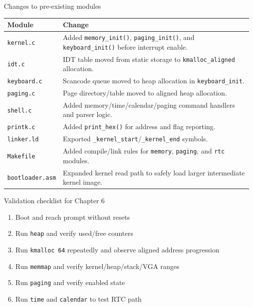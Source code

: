 \documentclass[aspectratio=169]{beamer}
\begin{document}
\begin{frame}{Changes to pre-existing modules}
  \small
  \begin{tabular}{@{}p{2.5cm}p{9.5cm}@{}}
    \toprule
    \textbf{Module} & \textbf{Change} \\
    \midrule
    \texttt{kernel.c} & Added \texttt{memory\_init()}, \texttt{paging\_init()}, and \texttt{keyboard\_init()} before interrupt enable. \\
    \texttt{idt.c} & IDT table moved from static storage to \texttt{kmalloc\_aligned} allocation. \\
    \texttt{keyboard.c} & Scancode queue moved to heap allocation in \texttt{keyboard\_init}. \\
    \texttt{paging.c} & Page directory/table moved to aligned heap allocation. \\
    \texttt{shell.c} & Added memory/time/calendar/paging command handlers and parser logic. \\
    \texttt{printk.c} & Added \texttt{print\_hex()} for address and flag reporting. \\
    \texttt{linker.ld} & Exported \texttt{\_kernel\_start}/\texttt{\_kernel\_end} symbols. \\
    \texttt{Makefile} & Added compile/link rules for \texttt{memory}, \texttt{paging}, and \texttt{rtc} modules. \\
    \texttt{bootloader.asm} & Expanded kernel read path to safely load larger intermediate kernel image. \\
    \bottomrule
  \end{tabular}
\end{frame}

\begin{frame}{Validation checklist for Chapter 6}
  \begin{enumerate}
    \item Boot and reach prompt without resets
    \item Run \texttt{heap} and verify used/free counters
    \item Run \texttt{kmalloc 64} repeatedly and observe aligned address progression
    \item Run \texttt{memmap} and verify kernel/heap/stack/VGA ranges
    \item Run \texttt{paging} and verify enabled state
    \item Run \texttt{time} and \texttt{calendar} to test RTC path
  \end{enumerate}
\end{frame}
\end{document}
